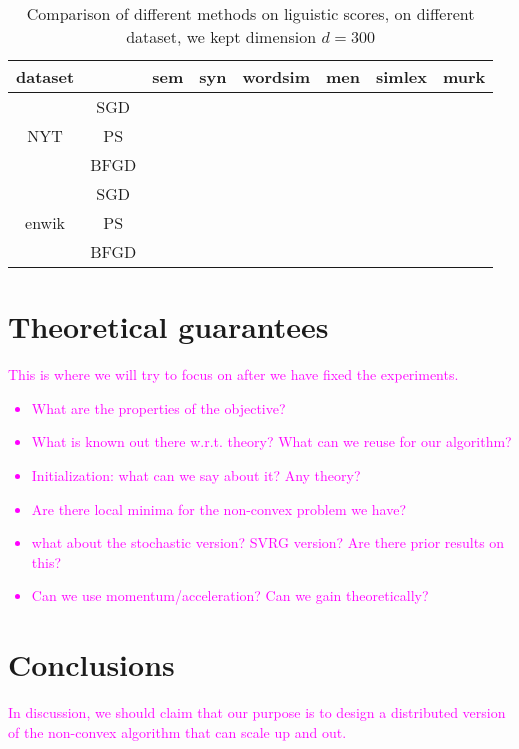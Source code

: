 \documentclass[letterpaper]{article} %
\begin{document}
\begin{table}[]
\begin{tabular}{|c|c|c|c|c|c|c|c|}
\hline
   dataset  &      & sem & syn & wordsim & men & simlex & murk \\ \hline

\multirow{3}{*}{NYT} & SGD   &     &     &         &     &        &      \\ \cline{2-8} 
					 & PS   &     &     &         &     &        &      \\ \cline{2-8} 
                     & BFGD &     &     &         &     &        &      \\ \hline
\multirow{3}{*}{enwik} & SGD   &     &     &         &     &        &      \\ \cline{2-8} 
					 & PS   &     &     &         &     &        &      \\ \cline{2-8} 
                     & BFGD &     &     &         &     &        &      \\ \hline
\end{tabular}
\caption{Comparison of different methods on liguistic scores, on different dataset, we kept dimension $d=300$}
\end{table}
\section{Theoretical guarantees}
\textcolor{magenta}{This is where we will try to focus on after we have fixed the experiments. 
\begin{itemize}
\item What are the properties of the objective?
\item What is known out there w.r.t. theory? What can we reuse for our algorithm?
\item Initialization: what can we say about it? Any theory?
\item Are there local minima for the non-convex problem we have?
\item what about the stochastic version? SVRG version? Are there prior results on this?
\item Can we use momentum/acceleration? Can we gain theoretically?
\end{itemize}}

\section{Conclusions}
\textcolor{magenta}{In discussion, we should claim that our purpose is to design a distributed version of the non-convex algorithm that can scale up and out.}


\end{document}
